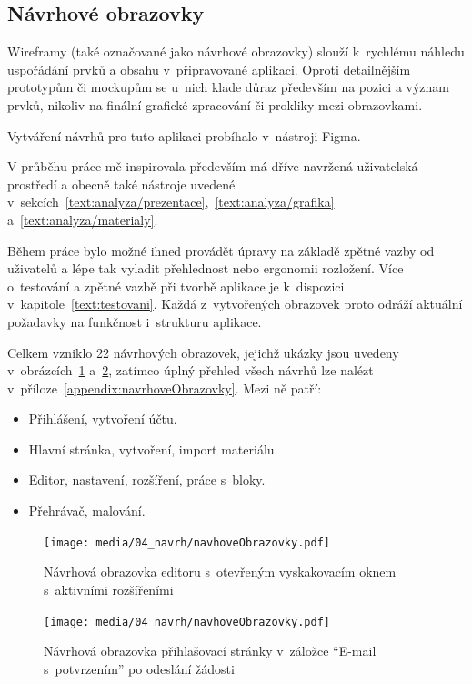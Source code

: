 \subsection{Návrhové obrazovky}

Wireframy (také označované jako návrhové obrazovky) slouží k~rychlému náhledu uspořádání prvků a obsahu v~připravované aplikaci. 
Oproti detailnějším prototypům či mockupům se u~nich klade důraz především na pozici a význam prvků, nikoliv na finální grafické zpracování či prokliky mezi obrazovkami.

Vytváření návrhů pro tuto aplikaci probíhalo v~nástroji Figma. 

V průběhu práce mě inspirovala především má dříve navržená uživatelská prostředí a obecně také nástroje uvedené v~sekcích~\ref{text:analyza/prezentace},~\ref{text:analyza/grafika} a~\ref{text:analyza/materialy}.

Během práce bylo možné ihned provádět úpravy na základě zpětné vazby od uživatelů a lépe tak vyladit přehlednost nebo ergonomii rozložení. 
Více o~testování a zpětné vazbě při tvorbě aplikace je k~dispozici v~kapitole~\ref{text:testovani}.
Každá z~vytvořených obrazovek proto odráží aktuální požadavky na funkčnost i~strukturu aplikace.


Celkem vzniklo 22 návrhových obrazovek, jejichž ukázky jsou uvedeny v~obrázcích~\ref{fig:navrhovaObrazovkaRozsireni} a~\ref{fig:navrhovaObrazovkaEmailAKod}, zatímco úplný přehled všech návrhů lze nalézt v~příloze~\ref{appendix:navrhoveObrazovky}.
Mezi ně patří:

\begin{itemize}
    \item Přihlášení, vytvoření účtu.
    \item Hlavní stránka, vytvoření, import materiálu.
    \item Editor, nastavení, rozšíření, práce s~bloky.
    \item Přehrávač, malování.
\end{itemize}


\begin{figure}[ht!]
    \centering
    \texttt{[image: media/04\_navrh/navhoveObrazovky.pdf]}
    \caption{Návrhová obrazovka editoru s~otevřeným vyskakovacím oknem s~aktivními rozšířeními}\label{fig:navrhovaObrazovkaRozsireni}
\end{figure}

\begin{figure}[ht!]
    \centering
    \texttt{[image: media/04\_navrh/navhoveObrazovky.pdf]}
    \caption{Návrhová obrazovka přihlašovací stránky v~záložce \enquote{E-mail s~potvrzením} po odeslání žádosti}\label{fig:navrhovaObrazovkaEmailAKod}
\end{figure}


